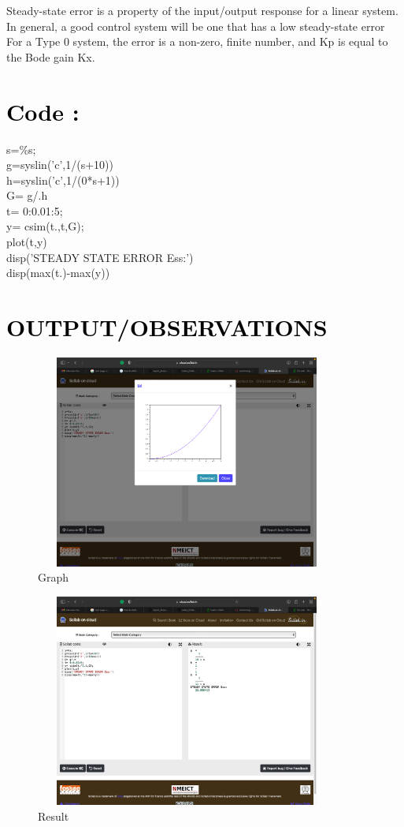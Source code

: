 \documentclass[12pt]{article}
\begin{document}
Steady-state error is a property of the input/output response for a linear system. In general, a good control system will be one that has a low steady-state error
For a Type 0 system, the error is a non-zero, finite number, and Kp is equal to the Bode gain Kx. \par

\section*{\textcolor{black}{Code :}}

    s=\%s;\\ 
   g=syslin('c',1/(s+10))\\
   h=syslin('c',1/(0*s+1))\\
   G= g/.h\\
   t= 0:0.01:5;\\
   y= csim(t.,t,G);\\
   plot(t,y)\\
   disp('STEADY STATE ERROR Ess:')\\
   disp(max(t.)-max(y)) \par 

\section*{\textcolor{black}{OUTPUT/OBSERVATIONS}}

\begin{figure}[!hth]
        \centering
        \includegraphics[width =10cm, height = 7cm]{images/exp31.png}
        \caption{Graph}
        \label{Graph}
\end{figure}
\begin{figure}[!hth]
        \centering
        \includegraphics[width =10cm, height = 7cm]{images/exp32.png}
        \caption{Result}
        \label{Result}
\end{figure}
\end{document}
